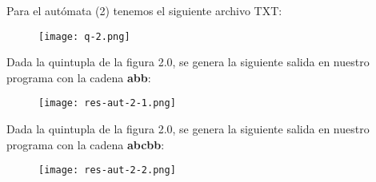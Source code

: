 Para el autómata (2) tenemos el siguiente archivo TXT:

\begin{figure}[H]
\texttt{[image: q-2.png]}
\centering \linebreak {}
\end{figure} 

Dada la quintupla de la figura 2.0, se genera la siguiente salida en nuestro programa con la cadena \textbf{abb}:

\begin{figure}[H]
\texttt{[image: res-aut-2-1.png]}
\centering \linebreak {}
\end{figure} 

Dada la quintupla de la figura 2.0, se genera la siguiente salida en nuestro programa con la cadena \textbf{abcbb}:

\begin{figure}[H]
\texttt{[image: res-aut-2-2.png]}
\centering \linebreak {}
\end{figure}

\pagebreak